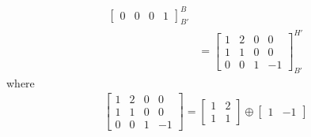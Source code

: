 \begin{solution}
\begin{align*}
\begin{bmatrix}
0 & 0 & 0 & 1
\end{bmatrix}_{B'}^B \\
&=
\begin{bmatrix}
1 & 2 & 0 & 0 \\
1 & 1 & 0 & 0 \\
0 & 0 & 1 & -1
\end{bmatrix}_{B'}^{H'}
\end{align*}
where
\begin{align*}
\begin{bmatrix}
1 & 2 & 0 & 0 \\
1 & 1 & 0 & 0 \\
0 & 0 & 1 & -1
\end{bmatrix} =
\begin{bmatrix}
1 & 2 \\
1 & 1
\end{bmatrix}
\oplus 
\begin{bmatrix}
1 & -1
\end{bmatrix}
\end{align*}
\end{solution}

